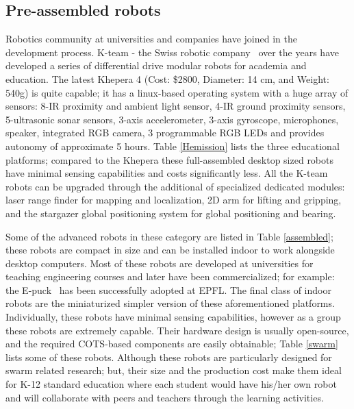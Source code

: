 \documentclass[conference]{IEEEtran}
\begin{document}
\subsection{Pre-assembled robots}

Robotics community at universities and companies have joined in the development process. K-team - the Swiss robotic 
company~\cite{k-team} over the years have developed a series of differential drive modular robots for academia and 
education. The latest Khepera 4 (Cost: \$2800, Diameter: 14 cm, and Weight: 540g) is quite capable; it has a linux-based 
operating system with a huge array of sensors: 8-IR proximity and ambient light sensor, 4-IR ground proximity sensors, 
5-ultrasonic sonar sensors, 3-axis accelerometer, 3-axis gyroscope, microphones, speaker, integrated RGB camera, 3 
programmable RGB LEDs and provides autonomy of approximate 5 hours. Table \ref{Hemission} lists the three educational 
platforms; compared to the Khepera these full-assembled desktop sized robots have minimal sensing capabilities and 
costs significantly less. All the K-team robots can be upgraded through the additional of specialized dedicated modules: 
laser range finder for mapping and localization, 2D arm for lifting and gripping, and the stargazer global positioning 
system for global positioning and bearing.


Some of the advanced robots in these category are listed in Table 
\ref{assembled}; these robots are compact in size and can be installed indoor to work alongside desktop computers. Most 
of these robots are developed at universities for teaching engineering courses and later have been commercialized; for 
example: the E-puck~\cite{mondada2009puck} has been successfully adopted at EPFL. The final class of indoor robots are 
the miniaturized simpler version of these aforementioned platforms. Individually, these robots have minimal sensing 
capabilities, however as a group these robots are extremely capable. Their hardware design is usually open-source, and 
the required COTS-based components are easily obtainable; Table \ref{swarm} lists some of these robots. Although these 
robots are particularly designed for swarm related research; but, their size and the production cost make them ideal 
for K-12 standard education where each student would have his/her own robot and will collaborate with peers and teachers 
through the learning activities. 
\end{document}
